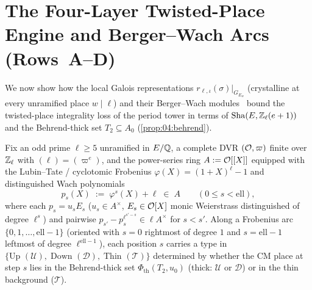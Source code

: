 \section{The Four-Layer Twisted-Place Engine and Berger--Wach Arcs (Rows~A--D)}
\label{sec:18:berger-wach}

We now show how the local Galois representations $r_{\ell, \iota}(\sigma)|_{G_{E_w}}$ (crystalline at every unramified place $w \mid \ell$) and their Berger--Wach modules~\cite{Berger2004} bound the twisted-place integrality loss of the period tower in terms of $\mathrm{Sha}(E, \mathbb{Z}_\ell(e+1))$ and the Behrend-thick set $T_2 \subseteq A_0$ (\cref{prop:04:behrend}).

Fix an odd prime $\ell \ge 5$ unramified in $E/\mathbb{Q}$, a complete DVR $(\mathcal{O}, \varpi)$ finite over $\mathbb{Z}_\ell$ with $(\ell) = (\varpi^e)$, and the power-series ring $A := \mathcal{O}[[X]]$ equipped with the Lubin--Tate / cyclotomic Frobenius $\varphi(X) = (1 + X)^\ell - 1$ and distinguished Wach polynomials
\begin{equation}
\label{eq:18:wach-polys}
  p_s(X) \;:=\; \varphi^s(X) + \ell \;\in\; A \qquad (0 \le s < \mathrm{ell}),
\end{equation}
where each $p_s = u_s E_s$ ($u_s \in A^\times$, $E_s \in \mathcal{O}[X]$ monic Weierstrass distinguished of degree $\ell^s$) and pairwise $p_{s'} - p_s^{\ell^{s'-s}} \in \ell A^\times$ for $s < s'$. Along a Frobenius arc $\{0, 1, \dots, \mathrm{ell} - 1\}$ (oriented with $s = 0$ rightmost of degree $1$ and $s = \mathrm{ell} - 1$ leftmost of degree $\ell^{\mathrm{ell}-1}$), each position $s$ carries a type in $\{\text{Up } (\mathcal{U}),\; \text{Down } (\mathcal{D}),\; \text{Thin } (\mathcal{T})\}$ determined by whether the CM place at step $s$ lies in the Behrend-thick set $\Phi_{\mathrm{th}}(T_2, u_0)$ (thick: $\mathcal{U}$ or $\mathcal{D}$) or in the thin background ($\mathcal{T}$).

